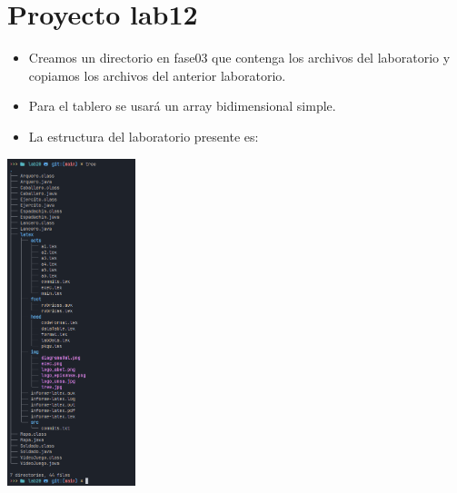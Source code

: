 \section{Proyecto lab12}
\begin{itemize}
  \item Creamos un directorio en fase03 que contenga los archivos del laboratorio y copiamos los archivos del anterior laboratorio.
  \item Para el tablero se usará un array bidimensional simple.
  \item La estructura del laboratorio presente es:
\end{itemize}
\includegraphics[width=0.28\textwidth]{img/tree.jpg}
